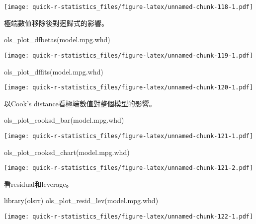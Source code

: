 \documentclass[
]{book}
\newenvironment{Shaded}{\begin{snugshade}}{\end{snugshade}}
\newcommand{\FunctionTok}[1]{\textcolor[rgb]{0.00,0.00,0.00}{#1}}
\newcommand{\NormalTok}[1]{#1}
\begin{document}
\texttt{[image: quick-r-statistics\_files/figure-latex/unnamed-chunk-118-1.pdf]}

極端數值移除後對迴歸式的影響。

\begin{Shaded}
\begin{Highlighting}[]
\FunctionTok{ols\_plot\_dfbetas}\NormalTok{(model.mpg.whd)}
\end{Highlighting}
\end{Shaded}

\texttt{[image: quick-r-statistics\_files/figure-latex/unnamed-chunk-119-1.pdf]}

\begin{Shaded}
\begin{Highlighting}[]
\FunctionTok{ols\_plot\_dffits}\NormalTok{(model.mpg.whd)}
\end{Highlighting}
\end{Shaded}

\texttt{[image: quick-r-statistics\_files/figure-latex/unnamed-chunk-120-1.pdf]}

以Cook's distance看極端數值對整個模型的影響。

\begin{Shaded}
\begin{Highlighting}[]
\FunctionTok{ols\_plot\_cooksd\_bar}\NormalTok{(model.mpg.whd)}
\end{Highlighting}
\end{Shaded}

\texttt{[image: quick-r-statistics\_files/figure-latex/unnamed-chunk-121-1.pdf]}

\begin{Shaded}
\begin{Highlighting}[]
\FunctionTok{ols\_plot\_cooksd\_chart}\NormalTok{(model.mpg.whd)}
\end{Highlighting}
\end{Shaded}

\texttt{[image: quick-r-statistics\_files/figure-latex/unnamed-chunk-121-2.pdf]}

看residual和leverage。

\begin{Shaded}
\begin{Highlighting}[]
\FunctionTok{library}\NormalTok{(olsrr)}
\FunctionTok{ols\_plot\_resid\_lev}\NormalTok{(model.mpg.whd)}
\end{Highlighting}
\end{Shaded}

\texttt{[image: quick-r-statistics\_files/figure-latex/unnamed-chunk-122-1.pdf]}
\end{document}
